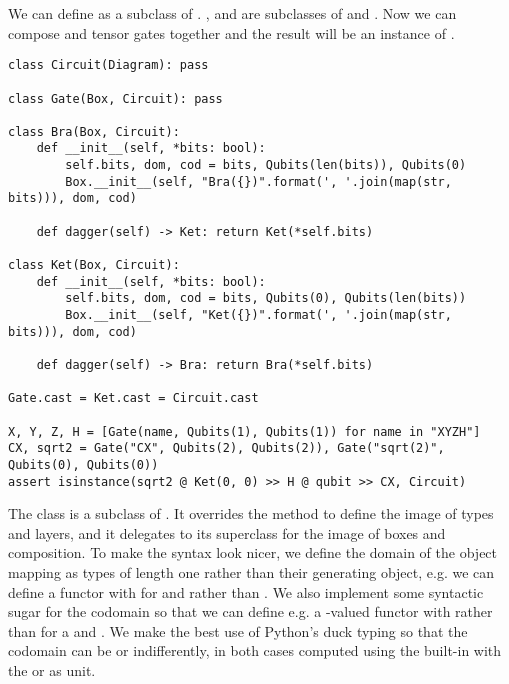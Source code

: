 \begin{example}\label{example:circuit-diagrams}
We can define  as a subclass of . ,  and  are subclasses of  and .
Now we can compose and tensor gates together and the result will be an instance of .

\begin{verbatim}
class Circuit(Diagram): pass

class Gate(Box, Circuit): pass

class Bra(Box, Circuit):
    def __init__(self, *bits: bool):
        self.bits, dom, cod = bits, Qubits(len(bits)), Qubits(0)
        Box.__init__(self, "Bra({})".format(', '.join(map(str, bits))), dom, cod)

    def dagger(self) -> Ket: return Ket(*self.bits)

class Ket(Box, Circuit):
    def __init__(self, *bits: bool):
        self.bits, dom, cod = bits, Qubits(0), Qubits(len(bits))
        Box.__init__(self, "Ket({})".format(', '.join(map(str, bits))), dom, cod)

    def dagger(self) -> Bra: return Bra(*self.bits)

Gate.cast = Ket.cast = Circuit.cast

X, Y, Z, H = [Gate(name, Qubits(1), Qubits(1)) for name in "XYZH"]
CX, sqrt2 = Gate("CX", Qubits(2), Qubits(2)), Gate("sqrt(2)", Qubits(0), Qubits(0))
assert isinstance(sqrt2 @ Ket(0, 0) >> H @ qubit >> CX, Circuit)
\end{verbatim}
\end{example}

The  class is a subclass of .
It overrides the  method to define the image of types and layers, and it delegates to its superclass for the image of boxes and composition.
To make the syntax look nicer, we define the domain of the object mapping as types of length one rather than their generating object, e.g. we can define a functor with  for  and  rather than .
We also implement some syntactic sugar for the codomain so that we can define e.g. a -valued functor with  rather than  for a  and .
We make the best use of Python's duck typing so that the codomain can be  or  indifferently, in both cases computed using the built-in  with the  or \py{[]} as unit.


